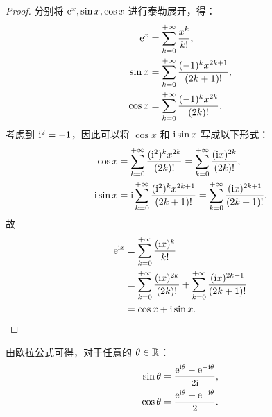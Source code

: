 \begin{proof}
     分别将 $\mathrm{e}^x, \sin x, \cos x$ 进行泰勒展开，得：
    \begin{align*}
        \mathrm{e}^x &= \sum_{k = 0}^{+\infty}\frac{x^k}{k!}, \\
        \sin x   &= \sum_{k = 0}^{+\infty}\frac{(-1)^kx^{2k + 1}}{(2k + 1)!}, \\
        \cos x   &= \sum_{k = 0}^{+\infty}\frac{(-1)^kx^{2k}}{(2k)!}.
    \end{align*}
    考虑到 $\mathrm{i}^2 = -1$，因此可以将 $\cos x$ 和 $\mathrm{i}\sin x$ 写成以下形式：
    \begin{align*}
        \cos x &= \sum_{k = 0}^{+\infty}\frac{(\mathrm{i}^2)^kx^{2k}}{(2k)!}
                = \sum_{k = 0}^{+\infty}\frac{(\mathrm{i} x)^{2k}}{(2k)!}, \\
        \mathrm{i}\sin x &= \mathrm{i}\sum_{k = 0}^{+\infty}\frac{(\mathrm{i}^2)^kx^{2k + 1}}{(2k + 1)!}
                = \sum_{k = 0}^{+\infty}\frac{(\mathrm{i} x)^{2k + 1}}{(2k + 1)!}.
    \end{align*}
    故
    \begin{align*}
        \mathrm{e}^{\mathrm{i} x} & = \sum_{k = 0}^{+\infty}\frac{(\mathrm{i} x)^k}{k!} \\
        & = \sum_{k = 0}^{+\infty}\frac{(\mathrm{i} x)^{2k}}{(2k)!} + 
            \sum_{k = 0}^{+\infty}\frac{(\mathrm{i} x)^{2k + 1}}{(2k + 1)!} \\
        & = \cos x + \mathrm{i} \sin x.
    \end{align*}
\end{proof}

\begin{corollary}
    由欧拉公式可得，对于任意的 $\theta \in \mathbb{R}$：
    \begin{align*}
        \sin \theta & = \frac{\mathrm{e}^{\mathrm{i}\theta} - \mathrm{e}^{-\mathrm{i}\theta}}{2\mathrm{i}}, \\
        \cos \theta & = \frac{\mathrm{e}^{\mathrm{i}\theta} + \mathrm{e}^{-\mathrm{i}\theta}}{2}.
    \end{align*}
\end{corollary}

